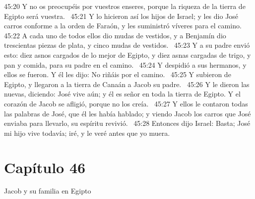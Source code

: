 45:20 Y no os preocupéis por vuestros enseres, porque la riqueza de la tierra de Egipto será vuestra.  
45:21 Y lo hicieron así los hijos de Israel; y les dio José carros conforme a la orden de Faraón, y les suministró víveres para el camino.  
45:22 A cada uno de todos ellos dio mudas de vestidos, y a Benjamín dio trescientas piezas de plata, y cinco mudas de vestidos.  
45:23 Y a su padre envió esto: diez asnos cargados de lo mejor de Egipto, y diez asnas cargadas de trigo, y pan y comida, para su padre en el camino.  
45:24 Y despidió a sus hermanos, y ellos se fueron. Y él les dijo: No riñáis por el camino.  
45:25 Y subieron de Egipto, y llegaron a la tierra de Canaán a Jacob su padre.  
45:26 Y le dieron las nuevas, diciendo: José vive aún; y él es señor en toda la tierra de Egipto. Y el corazón de Jacob se afligió, porque no los creía.  
45:27 Y ellos le contaron todas las palabras de José, que él les había hablado; y viendo Jacob los carros que José enviaba para llevarlo, su espíritu revivió.  
45:28 Entonces dijo Israel: Basta; José mi hijo vive todavía; iré, y le veré antes que yo muera.  
\section*{Capítulo 46}
Jacob y su familia en Egipto  

